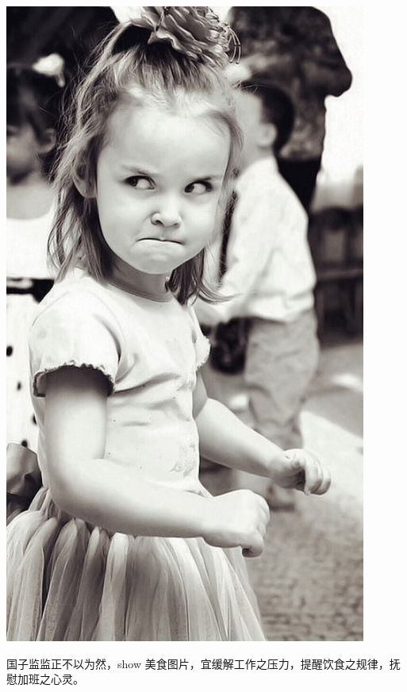 \documentclass[12pt, a4paper]{book}
\begin{document}
\begin{CJK}{UTF8}{gbsn}
    \includegraphics[height=0.3\textheight]{./figure/desktop-0.jpg}

    国子监监正不以为然，show 美食图片，宜缓解工作之压力，提醒饮食之规律，抚慰加班之心灵。


\end{CJK}
\end{document}
